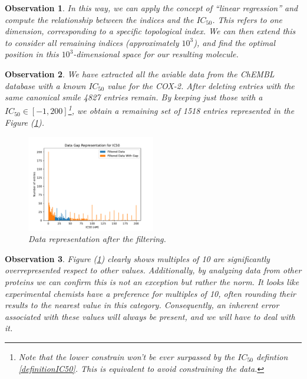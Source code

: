 \documentclass[12pt,letterpaper]{article}
\newtheorem{observation}{Observation}
\begin{document}
\begin{multicols}{2}
\begin{observation}
In this way, we can apply the concept of “linear regression” and compute the relationship between the indices and the $IC_{50}$. This refers to one dimension, corresponding to a specific topological index. We can then extend this to consider all remaining indices (approximately $10^3$), and find the optimal position in this $10^3$-dimensional space for our resulting molecule.
\end{observation}

\begin{observation}
We have extracted all the aviable data from the \emph{ChEMBL} database with a known $IC_{50}$ value for the COX-2. After deleting  entries with the same canonical smile 4827 entries remain. By keeping just those with a $IC_{50}\in [-1,200]$\footnote{Note that the lower constrain won't be ever surpassed by the $IC_{50}$ defintion \ref{definitionIC50}. This is equivalent to avoid constraining the data.}, we obtain a remaining set of 1518 entries represented in the Figure (\ref{figDataRepresentationFiltering}).
\begin{figure}[H]
\centering
\includegraphics[width = 0.5\textwidth]{../Plots/DataGapRepresentationIC50percentageEresed25.0Gap_min_15Gap_max_50.pdf}
\caption{Data representation after the filtering.}
\label{figDataRepresentationFiltering}
\end{figure}
\end{observation}

\begin{observation}\label{ObsDataInherentError}
Figure (\ref{figDataRepresentationFiltering}) clearly shows multiples of 10 are significantly overrepresented respect to other values. Additionally, by analyzing data from other proteins we can confirm this is not an exception but rather the norm. It looks like experimental chemists have a preference for multiples of 10, often rounding their results to the nearest value in this category. Consequently, an inherent error associated with these values will always be present, and we will have to deal with it.
\end{observation}


\end{multicols}
\end{document}
